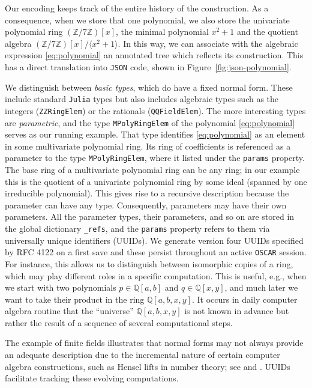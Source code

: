 \documentclass[runningheads]{llncs}
\newcommand\OSCAR{\texttt{OSCAR}\xspace}
\newcommand\Julia{\texttt{Julia}\xspace}
\newcommand\JSON{\texttt{JSON}\xspace}
\newcommand\QQ{{\mathbb Q}}
\newcommand\ZZ{{\mathbb Z}}
\begin{document}
Our encoding keeps track of the entire history of the construction.
As a consequence, when we store that one polynomial, we also store the univariate polynomial ring $(\ZZ / {7 \ZZ})[x]$, the minimal polynomial $x^2 + 1$ and the quotient algebra $(\ZZ / {7 \ZZ})[x]/ \langle x^2 + 1 \rangle$.
In this way, we can associate with the algebraic expression \eqref{eq:polynomial} an annotated tree which reflects its construction.
This has a direct translation into \JSON code, shown in Figure~\ref{fig:json-polynomial}.

We distinguish between \emph{basic types}, which do have a fixed normal form.
These include standard \Julia types but also includes algebraic types such as the integers (\texttt{ZZRingElem}) or the rationals (\texttt{QQFieldElem}).
The more interesting types are \emph{parametric}, and the type \texttt{MPolyRingElem} of the polynomial \eqref{eq:polynomial} serves as our running example.
That type identifies \eqref{eq:polynomial} as an element in some multivariate polynomial ring.
Its ring of coefficients is referenced as a parameter to the type \texttt{MPolyRingElem}, where it listed under the \texttt{params} property.
The base ring of a multivariate polynomial ring can be any ring; in our example this is the quotient of a univariate polynomial ring by some ideal (spanned by one irreducible polynomial).
This gives rise to a recursive description because the parameter can have any type.
Consequently, parameters may have their own parameters.
All the parameter types, their parameters, and so on are stored in the global dictionary \texttt{\_refs}, and the \texttt{params} property refers to them via universally unique identifiers (UUIDs). We generate version four UUIDs specified by RFC 4122 on a first save and these persist throughout an active \OSCAR session.
For instance, this allows us to distinguish between isomorphic copies of a ring, which may play different roles in a specific computation.
This is useful, e.g., when we start with two polynomials $p\in\QQ[a,b]$ and $q\in\QQ[x,y]$, and much later we want to take their product in the ring $\QQ[a,b,x,y]$.
It occurs in daily computer algebra routine that the \enquote{universe} $\QQ[a,b,x,y]$ is not known in advance but rather the result of a sequence of several computational steps.

The example of finite fields illustrates that normal forms may not always provide an adequate description due to the incremental nature of certain computer algebra constructions, such as Hensel lifts in number theory; see \cite{BuchbergerLoos:1983} and \cite[\S15.4]{vonzurGathenGerhard:1999}. UUIDs facilitate tracking these evolving computations.
\end{document}
